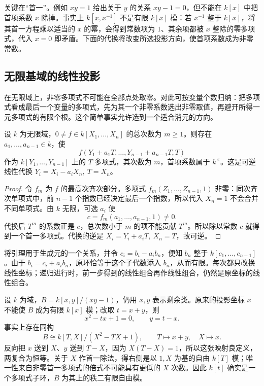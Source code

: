 关键在“首一”。例如 \(xy=1\) 给出关于 \(y\) 的关系 \(xy-1=0\)，但不能在 \(k[x]\) 中把首项系数 \(x\) 除掉。事实上 \(k[x,x^{-1}]\) 不是有限 \(k[x]\) 模：若 \(x^{-1}\) 整于 \(k[x]\)，将其首一方程乘以适当的 \(x\) 的幂，会得到常数项为 \(1\)、其余项都被 \(x\) 整除的零多项式，代入 \(x=0\) 即矛盾。下面的代换将改变所选投影方向，使首项系数成为非零常数。

\subsection{无限基域的线性投影}
\label{g5:subsec:0302:02}

在无限域上，非零多项式不可能在全部点处取零。对此可按变量个数归纳：把多项式看成最后一个变量的多项式，先为其一个非零系数选出非零取值，再避开所得一元多项式的有限个根。这个简单事实允许选到一个适合消元的方向。

\begin{lemma}\label{g5:lem:linear-monic-change}
	设 \(k\) 为无限域，\(0\ne f\in k[X_1,\ldots,X_n]\) 的总次数为 \(m\geq1\)。则存在 \(a_1,\ldots,a_{n-1}\in k\)，使
	\[
	f(Y_1+a_1T,\ldots,Y_{n-1}+a_{n-1}T,T)
	\]
	作为 \(k[Y_1,\ldots,Y_{n-1}]\) 上的 \(T\) 多项式，其次数为 \(m\)，首项系数属于 \(k^\times\)。这是可逆线性代换
	\(Y_i=X_i-a_iX_n,\ T=X_n\)。
\end{lemma}
\begin{proof}
	令 \(f_m\) 为 \(f\) 的最高次齐次部分。多项式
	\(f_m(Z_1,\ldots,Z_{n-1},1)\) 非零：同次齐次单项式中，前 \(n-1\) 个指数已经决定最后一个指数，所以代入 \(X_n=1\) 不会合并不同单项式。由 \(k\) 无限，可选 \(a_i\) 使
	\[
	c=f_m(a_1,\ldots,a_{n-1},1)\ne0.
	\]
	代换后 \(T^m\) 的系数正是 \(c\)，总次数小于 \(m\) 的项不能贡献 \(T^m\)。所以除以常数 \(c\) 就得到一个首一多项式。代换的逆是 \(X_i=Y_i+a_iT,\ X_n=T\)，故可逆。
\end{proof}

将引理用于生成元的一个关系，并令 \(c_i=b_i-a_ib_n\)，便知 \(b_n\) 整于 \(k[c_1,\ldots,c_{n-1}]\)。由于 \(b_i=c_i+a_ib_n\)，原环恰等于这个子代数添入 \(b_n\)，从而有限。每次都只改换线性坐标；递归进行时，前一步得到的线性组合再作线性组合，仍然是原坐标的线性组合。

\begin{example}\label{g5:exm:hyperbola-finite-projection}
	设 \(k\) 为域，\(B=k[x,y]/(xy-1)\)，仍用 \(x,y\) 表示剩余类。原来的投影坐标 \(x\) 不能使 \(B\) 成为有限 \(k[x]\) 模；改取 \(t=x+y\)，则
	\[
	x^2-tx+1=0,\qquad y=t-x.
	\]
	事实上存在同构
	\[
	B\cong k[T,X]/(X^2-TX+1),
	\qquad T\longmapsto x+y,\quad X\longmapsto x.
	\]
	反向把 \(x\) 送到 \(X\)、\(y\) 送到 \(T-X\)，因为 \(X(T-X)=1\)，所以这张映射良定义，两复合为恒等。关于 \(X\) 作首一除法，得右侧是以 \(1,X\) 为基的自由 \(k[T]\) 模；唯一性来自非零首一多项式的倍式不可能具有更低的 \(X\) 次数。因此 \(k[t]\) 确实是一个多项式子环，\(B\) 为其上的秩二有限自由模。
\end{example}

